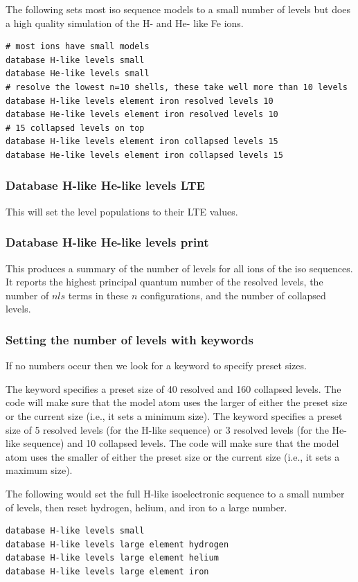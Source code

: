 The following sets most iso sequence models to a small number of levels
but does a high quality simulation of the H- and He- like Fe ions.
\begin{verbatim}
# most ions have small models
database H-like levels small
database He-like levels small
# resolve the lowest n=10 shells, these take well more than 10 levels
database H-like levels element iron resolved levels 10
database He-like levels element iron resolved levels 10
# 15 collapsed levels on top
database H-like levels element iron collapsed levels 15
database He-like levels element iron collapsed levels 15
\end{verbatim}

\subsubsection{Database H-like \OR{} He-like levels LTE}

This will set the level populations to their LTE values.

\subsubsection{Database H-like \OR{} He-like levels print}

This produces a summary of the number of levels for all ions of the iso sequences.
It reports the highest principal quantum number of the resolved levels,
the number of $nls$ terms in these $n$ configurations,
and the number of collapsed levels.

\subsubsection{Setting the number of levels with keywords}

If no numbers occur then we look for a keyword to specify preset sizes.

The keyword  specifies a preset size of 40 resolved and 160
collapsed levels. The code will make sure that the model atom uses the larger
of either the preset size or the current size (i.e., it sets a minimum size).
The keyword  specifies a preset size of 5 resolved levels
(for the H-like sequence) or 3 resolved levels (for the He-like sequence) and
10 collapsed levels. The code will make sure that the model atom uses the
smaller of either the preset size or the current size (i.e., it sets a maximum
size).

The following would set the full H-like isoelectronic
sequence to a small number of levels, then reset hydrogen, helium,
and iron to a large number.
\begin{verbatim}
database H-like levels small
database H-like levels large element hydrogen
database H-like levels large element helium
database H-like levels large element iron
\end{verbatim}

